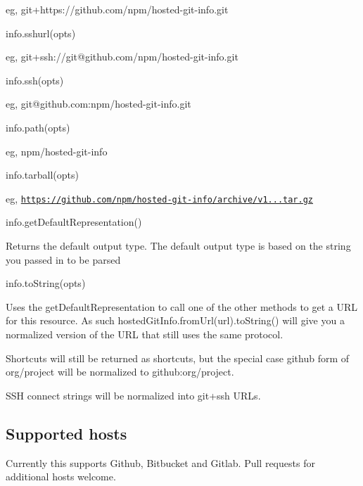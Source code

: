 eg, {\ttfamily git+https\+://github.com/npm/hosted-\/git-\/info.\+git}


\begin{DoxyItemize}
\item info.\+sshurl(opts)
\end{DoxyItemize}

eg, {\ttfamily git+ssh\+://git@github.\+com/npm/hosted-\/git-\/info.git}


\begin{DoxyItemize}
\item info.\+ssh(opts)
\end{DoxyItemize}

eg, {\ttfamily git@github.\+com\+:npm/hosted-\/git-\/info.\+git}


\begin{DoxyItemize}
\item info.\+path(opts)
\end{DoxyItemize}

eg, {\ttfamily npm/hosted-\/git-\/info}


\begin{DoxyItemize}
\item info.\+tarball(opts)
\end{DoxyItemize}

eg, {\ttfamily \href{https://github.com/npm/hosted-git-info/archive/v1.2.0.tar.gz}{\tt https\+://github.\+com/npm/hosted-\/git-\/info/archive/v1...\+tar.\+gz}}


\begin{DoxyItemize}
\item info.\+get\+Default\+Representation()
\end{DoxyItemize}

Returns the default output type. The default output type is based on the string you passed in to be parsed


\begin{DoxyItemize}
\item info.\+to\+String(opts)
\end{DoxyItemize}

Uses the get\+Default\+Representation to call one of the other methods to get a U\+RL for this resource. As such {\ttfamily hosted\+Git\+Info.\+from\+Url(url).to\+String()} will give you a normalized version of the U\+RL that still uses the same protocol.

Shortcuts will still be returned as shortcuts, but the special case github form of {\ttfamily org/project} will be normalized to {\ttfamily github\+:org/project}.

S\+SH connect strings will be normalized into {\ttfamily git+ssh} U\+R\+Ls.

\subsection*{Supported hosts}

Currently this supports Github, Bitbucket and Gitlab. Pull requests for additional hosts welcome. 